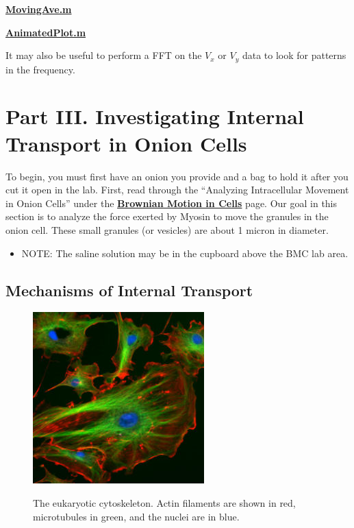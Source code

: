 \documentclass{../lab}
\begin{document}
\href{http://dev-physicsadv.pantheon.berkeley.edu/sites/default/files/matlab\_fitting/MovingAve.m}{\textbf{MovingAve.m}}

\href{http://dev-physicsadv.pantheon.berkeley.edu/sites/default/files/matlab\_fitting/AnimatedPlot.m}{\textbf{AnimatedPlot.m}}

It may also be useful to perform a FFT on the $V_x$ or $V_y$ data to look for patterns in the frequency.

\section{Part III. Investigating Internal Transport in Onion Cells}

To begin, you must first have an onion you provide and a bag to hold it after you cut it open in the lab. First, read through the ``Analyzing Intracellular Movement in Onion Cells'' under the \href{http://dev-physicsadv.pantheon.berkeley.edu/BMC}{\textbf{Brownian Motion in Cells}} page. Our goal in this section is to analyze the force exerted by Myosin to move the granules in the onion cell. These small granules (or vesicles) are about 1 micron in diameter.

\begin{itemize}
    \item NOTE: The saline solution may be in the cupboard above the BMC lab area.

\end{itemize}

\subsection{Mechanisms of Internal Transport}

\begin{figure}[h]
    \centering
    \href{http://experimentationlab.berkeley.edu/sites/default/files/images/250px-BMC_Cytoskeleton.jpg}{\includegraphics[width=0.5\linewidth]{images/250px-BMC_Cytoskeleton.jpg}}
    \caption{The eukaryotic cytoskeleton. Actin filaments are shown in red, microtubules in green, and the nuclei are in blue.}
    \label{fig:250px-BMC_Cytoskeleton}
\end{figure}
\end{document}
